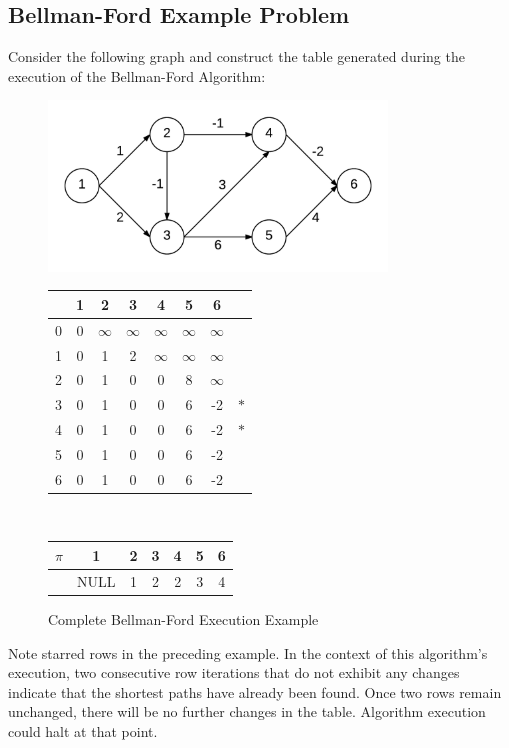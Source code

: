 \documentclass[12pt,letterpaper]{article}
\begin{document}
\subsection{Bellman-Ford Example Problem}
Consider the following graph and construct the table generated during the execution of the Bellman-Ford Algorithm:
\begin{figure}[h]
\centering
\includegraphics[width=9cm]{bfex2}\\
\begin{tabular}{|c|c|c|c|c|c|c|c|}
\hline
 &1&2&3&4&5&6& \\ \hline \hline
0&0&$\infty$&$\infty$&$\infty$&$\infty$&$\infty$& \\ \hline
1&0&1&2&$\infty$&$\infty$&$\infty$& \\ \hline
2&0&1&0&0&8&$\infty$& \\ \hline
3&0&1&0&0&6&-2&$\ast$\\ \hline
4&0&1&0&0&6&-2&$\ast$\\ \hline
5&0&1&0&0&6&-2& \\ \hline
6&0&1&0&0&6&-2& \\ \hline
\end{tabular}\\
\vspace{.5cm}
\begin{tabular}{|c|c|c|c|c|c|c|}
\hline
$\pi$&1&2&3&4&5&6 \\ \hline
 &NULL&1&2&2&3&4\\ \hline
\end{tabular}
\caption{Complete Bellman-Ford Execution Example}
\end{figure}
\FloatBarrier
Note starred rows in the preceding example. In the context of this algorithm's execution, two consecutive row iterations that do not exhibit any changes indicate that the shortest paths have already been found. Once two rows remain unchanged, there will be no further changes in the table. Algorithm execution could halt at that point.
\end{document}
